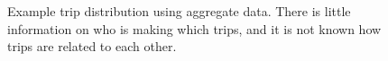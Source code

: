 \documentclass[fancy, oneside, mastersfancy, ms]{byuthesis}
\begin{document}
\begin{figure}


\caption[Example network assignment using aggregate
data.]{\label{fig-network-aggregate}Example trip distribution using
aggregate data. There is little information on who is making which
trips, and it is not known how trips are related to each other.}

\end{figure}%
\end{document}
